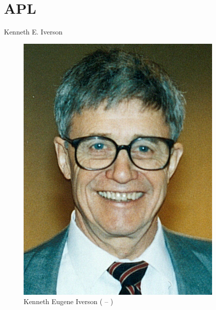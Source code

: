 \section{APL}

\begin{frame}[fragile]{Kenneth E. Iverson}

    \begin{figure}
        \centering 
        \includegraphics[scale=1.2]{figs/iverson.png}
        \caption{Kenneth Eugene Iverson ( -- )}
    \end{figure}

\end{frame}


